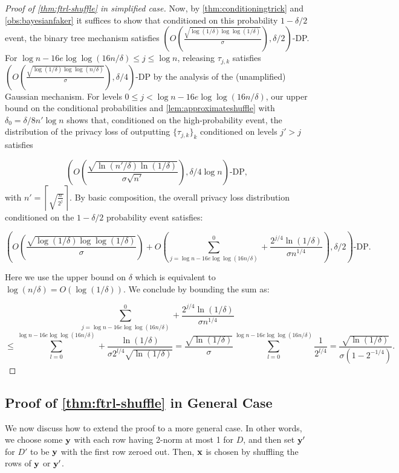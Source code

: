 \begin{proof}[Proof of \cref{thm:ftrl-shuffle} in simplified case]
Now, by \cref{thm:conditioningtrick} and \cref{obs:bayesianfaker} it suffices to show that conditioned on this probability $1 - \delta/2$ event, the binary tree mechanism satisfies $\left(O\left(\frac{\sqrt{\log(1/\delta) \log \log(1/\delta)}}{\sigma}\right), \delta/2\right)$-DP. For $\log n - 16e \log \log (16n/\delta) \leq j \leq \log n$, releasing $\tau_{j,k}$ satisfies $\left(O\left(\frac{\sqrt{\log(1/\delta) \log \log(n/\delta)}}{\sigma}\right), \delta/4\right)$-DP by the analysis of the (unamplified) Gaussian mechanism. For levels $0 \leq j < \log n - 16e \log \log (16n/\delta)$, our upper bound on the conditional probabilities and \cref{lem:approximateshuffle} with $\delta_0 = \delta / 8 n' \log n$ shows that, conditioned on the high-probability event, the distribution of the privacy loss of outputting $\{\tau_{j,k}\}_k$ conditioned on levels $j' > j$ satisfies 

\[\left(O\left(\frac{\sqrt{ \ln (n' / \delta) \ln(1/\delta)}}{\sigma \sqrt{n'}}\right), \delta / 4 \log n\right)\text{-DP},\] with $n' = \left\lceil \sqrt{\frac{n}{2^j}} \right\rceil$. By basic composition, the overall privacy loss distribution conditioned on the $1 - \delta / 2$ probability event satisfies:

\[\left(O\left(\frac{\sqrt{\log(1/\delta) \log \log(1/\delta)}}{\sigma}\right) + O\left(\sum_{j = \log n - 16e \log \log (16n/\delta)}^0 + \frac{2^{j/4} \ln (1 / \delta)}{\sigma n^{1/4}}\right), \delta/2\right)\text{-DP}.\]

Here we use the upper bound on $\delta$ which is equivalent to $\log(n/\delta) = O(\log(1/\delta))$. We conclude by bounding the sum as:

\[\sum_{j = \log n - 16e \log \log (16n/\delta)}^0 + \frac{2^{j/4} \ln(1/\delta)}{\sigma n^{1/4}}\]
\[ \leq \sum_{l = 0}^{ \log n - 16e \log \log (16n/\delta)} + \frac{\ln(1/\delta)}{\sigma 2^{l/4} \sqrt{\ln(1/\delta)}} = \frac{\sqrt{\ln(1/\delta)}}{\sigma}\sum_{l = 0}^{ \log n - 16e \log \log (16n/\delta)} \frac{1}{2^{l/4}} = \frac{\sqrt{\ln(1/\delta)}}{\sigma(1 - 2^{-1/4})}.\]
\end{proof}

\subsection{Proof of \cref{thm:ftrl-shuffle} in General Case}

We now discuss how to extend the proof to a more general case. In other words, we choose some $\mathbf{y}$ with each row having 2-norm at most 1 for $D$, and then set $\mathbf{y}'$ for $D'$ to be $\mathbf{y}$ with the first row zeroed out. Then, $\mathbf{x}$ is chosen by shuffling the rows of $\mathbf{y}$ or $\mathbf{y}'$. 

